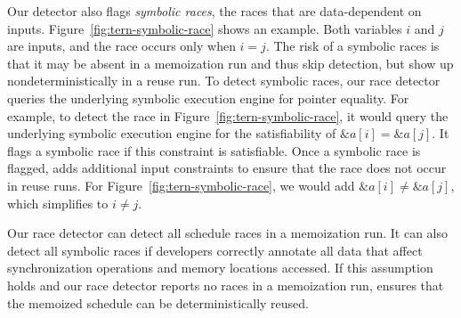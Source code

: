 Our detector also flags \emph{symbolic races}, the races that are
data-dependent on inputs.  Figure~\ref{fig:tern-symbolic-race} shows an example.
Both variables $i$ and $j$ are inputs, and the race occurs only when $i =
j$.  The risk of a symbolic races is that it may be absent in a
memoization run and thus skip detection, but show up nondeterministically
in a reuse run.  To detect symbolic races, our race detector queries the
underlying symbolic execution engine for pointer equality.  For example,
to detect the race in Figure~\ref{fig:tern-symbolic-race}, it would query the
underlying symbolic execution engine for the satisfiability of
$\&a[i]=\&a[j]$.  It flags a symbolic race if this constraint is satisfiable.
Once a symbolic race is flagged, \tern adds additional input constraints to
ensure that the race does not occur in reuse runs.  For
Figure~\ref{fig:tern-symbolic-race}, we would add $\&a[i]\neq \&a[j]$, which
simplifies to $i\neq j$.

Our race detector can detect all schedule races in a memoization run.  It
can also detect all symbolic races if developers correctly annotate all
data that affect synchronization operations and memory locations accessed.
If this assumption holds and our race detector reports no races in a
memoization run, \tern ensures that the memoized schedule can be
deterministically reused.




